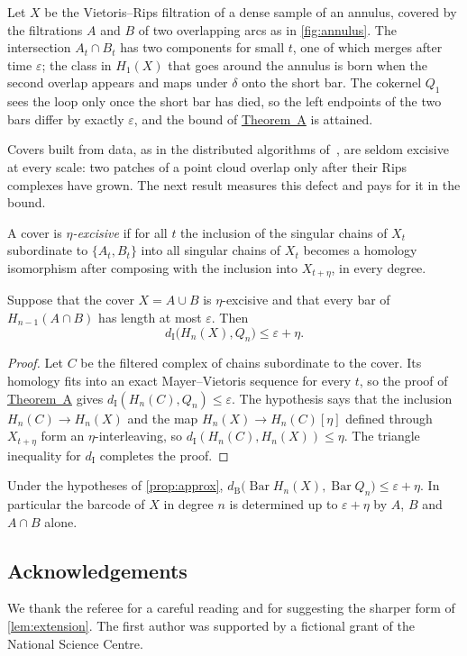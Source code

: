 \documentclass[11pt, twoside]{article}
\newcommand{\thmA}{\hyperref[thm:A]{Theorem~A}}
\newcommand{\sh}[2]{#1[#2]}
\DeclareMathOperator{\Barc}{Bar}
\newcommand{\dI}{d_{\mathrm{I}}}
\newcommand{\dB}{d_{\mathrm{B}}}
\begin{document}
\begin{example}
\label{ex:annulus}
Let $X$ be the Vietoris--Rips filtration of a dense sample of an annulus,
covered by the filtrations $A$ and $B$ of two overlapping arcs as in
\cref{fig:annulus}. The intersection $A_t\cap B_t$ has two components for
small $t$, one of which merges after time $\varepsilon$; the class in
$H_1(X)$ that goes around the annulus is born when the second overlap
appears and maps under $\delta$ onto the short bar. The cokernel $Q_1$ sees
the loop only once the short bar has died, so the left endpoints of the
two bars differ by exactly $\varepsilon$, and the bound of \thmA{}
is attained.
\end{example}

Covers built from data, as in the distributed algorithms
of~\cite{yoon2023,casas2021}, are seldom excisive at every scale: two patches of a
point cloud overlap only after their Rips complexes have grown. The next
result measures this defect and pays for it in the bound.

\begin{definition}
A cover is \emph{$\eta$-excisive} if for all $t$ the inclusion of the
singular chains of $X_t$ subordinate to $\{A_t, B_t\}$ into all singular
chains of $X_t$ becomes a homology isomorphism after composing with the
inclusion into $X_{t+\eta}$, in every degree.
\end{definition}

\begin{proposition}
\label{prop:approx}
Suppose that the cover $X = A\cup B$ is $\eta$-excisive and that every bar of
$H_{n-1}(A\cap B)$ has length at most $\varepsilon$. Then
\begin{equation}
\label{eq:approx}
\dI\bigl(H_n(X), Q_n\bigr) \le \varepsilon + \eta .
\end{equation}
\end{proposition}

\begin{proof}
Let $C$ be the filtered complex of chains subordinate to the cover. Its
homology fits into an exact Mayer--Vietoris sequence for every $t$, so the
proof of \thmA{} gives $\dI(H_n(C), Q_n) \le \varepsilon$. The
hypothesis says that the inclusion $H_n(C) \to H_n(X)$ and the map
$H_n(X) \to \sh{H_n(C)}{\eta}$ defined through $X_{t+\eta}$ form an
$\eta$-interleaving, so $\dI(H_n(C), H_n(X)) \le \eta$. The triangle
inequality for $\dI$ completes the proof.
\end{proof}

\begin{corollary}
\label{cor:local}
Under the hypotheses of \cref{prop:approx},
$\dB\bigl(\Barc H_n(X), \Barc Q_n\bigr) \le \varepsilon + \eta$. In particular
the barcode of $X$ in degree $n$ is determined up to $\varepsilon + \eta$ by
$A$, $B$ and $A\cap B$ alone.
\end{corollary}

\subsection*{Acknowledgements}
We thank the referee for a careful reading and for suggesting the sharper
form of \cref{lem:extension}. The first author was supported by a fictional
grant of the National Science Centre.

\printbibliography
\printaddresses
\end{document}
